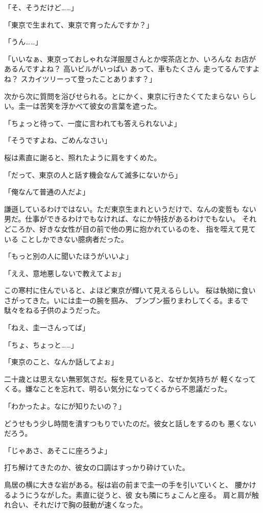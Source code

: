 ﻿\documentclass[
    book,tate,
    line_length=30zw,
    jafontsize=12pt,
    paper=b5j,
    landscape,
    ]{jlreq}
\begin{document}
「そ、そうだけど……」

「東京で生まれて、東京で育ったんですか？」

「うん……」

「いいなぁ、東京っておしゃれな洋服屋さんとか喫茶店とか、いろんな
お店があるんですよね？ 高いビルがいっぱい あって、車もたくさん
走ってるんですよね？ スカイツリーって登ったことあります？」

次から次に質問を浴びせられる。とにかく、東京に行きたくてたまらない
らしい。圭一は苦笑を浮かべて彼女の言葉を遮った。

「ちょっと待って、一度に言われても答えられないよ」

「そうですよね、ごめんなさい」

桜は素直に謝ると、照れたように肩をすくめた。

「だって、東京の人と話す機会なんて滅多にないから」

「俺なんて普通の人だよ」

謙遜しているわけではない。ただ東京生まれというだけで、なんの変哲も
ない男だ。仕事ができるわけでもなければ、なにか特技があるわけでもない。
それどころか、好きな女性が目の前で他の男に抱かれているのを、
指を咥えて見ている ことしかできない臆病者だった。

「もっと別の人に聞いたほうがいいよ」

「ええ、意地悪しないで教えてよぉ」

この寒村に住んでいると、よほど東京が輝いて見えるらしい。
桜は執拗に食いさがってきた。いには圭一の腕を掴み、
ブンブン振りまわしてくる。まるで駄々をねる子供のようだった。

「ねえ、圭一さんってば」

「ちょ、ちょっと……」

「東京のこと、なんか話してよぉ」

二十歳とは思えない無邪気さだ。桜を見ていると、なぜか気持ちが
軽くなってくる。嫌なことを忘れて、明るい気分になってくるから不思議だった。

「わかったよ。なにが知りたいの？」

どうせもう少し時間を潰すつもりでいたのだ。彼女と話しをするのも
悪くないだろう。

「じゃあさ、あそこに座ろうよ」

打ち解けてきたのか、彼女の口調はすっかり砕けていた。

鳥居の横に大きな岩がある。桜は岩の前まで圭一の手を引いていくと、
腰かけるようにうながした。素直に従うと、彼 女も隣にちょこんと座る。
肩と肩が触れ合い、それだけで胸の鼓動が速くなった。
\end{document}
